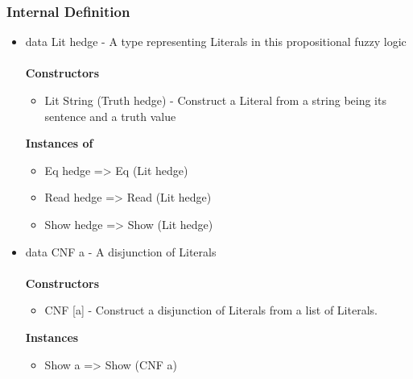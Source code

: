\documentclass[../gr-final.tex]{subfiles}
\begin{document}
\subsubsection{Internal Definition}
\begin{itemize}
        \item data Lit hedge - A type representing Literals in this propositional fuzzy
                logic\\\\
         {\bfseries Constructors}
         \begin{itemize}
                 \item  Lit String (Truth hedge) - Construct a
                         Literal from a string being its sentence and a truth value 
         \end{itemize}
         {\bfseries Instances of}
          \begin{itemize}
            \item Eq hedge => Eq (Lit hedge)
            \item Read hedge => Read (Lit hedge) 
            \item Show hedge => Show (Lit hedge)
          \end{itemize}

         \item data CNF a - A disjunction of Literals\\\\
         {\bfseries Constructors}
         \begin{itemize}
          \item CNF [a] - Construct a disjunction of Literals
                  from a list of Literals.
         \end{itemize}
        {\bfseries Instances}
        \begin{itemize}
         \item Show a => Show (CNF a)
        \end{itemize}


\end{itemize}
\end{document}
